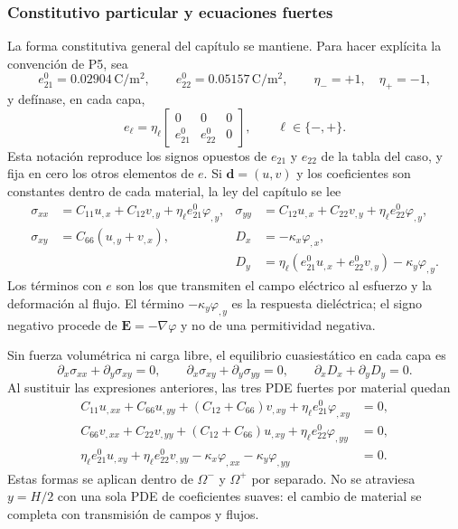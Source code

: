 \subsubsection{Constitutivo particular y ecuaciones fuertes}

La forma constitutiva general del capítulo se mantiene. Para hacer explícita
la convención de P5, sea
\[
  e_{21}^{0}=0.02904\,\mathrm{C}/\mathrm{m}^{2},\qquad
  e_{22}^{0}=0.05157\,\mathrm{C}/\mathrm{m}^{2},\qquad
  \eta_-=+1,\quad \eta_+=-1,
\]
y defínase, en cada capa,
\begin{equation}
  e_\ell=\eta_\ell
  \begin{bmatrix}
    0&0&0\\
    e_{21}^{0}&e_{22}^{0}&0
  \end{bmatrix},
  \qquad \ell\in\{-,+\}.
  \label{eq:p5-expansion-e-sign}
\end{equation}
Esta notación reproduce los signos opuestos de $e_{21}$ y $e_{22}$ de la
tabla del caso, y fija en cero los otros elementos de $e$. Si
$\mathbf d=(u,v)$ y los coeficientes son constantes dentro de cada material,
la ley del capítulo se lee
\begin{align}
  \sigma_{xx}&=C_{11}u_{,x}+C_{12}v_{,y}
       +\eta_\ell e_{21}^{0}\varphi_{,y},
  &\sigma_{yy}&=C_{12}u_{,x}+C_{22}v_{,y}
       +\eta_\ell e_{22}^{0}\varphi_{,y},
  \label{eq:p5-expansion-stress-normal}\\
  \sigma_{xy}&=C_{66}(u_{,y}+v_{,x}),
  &D_x&=-\kappa_x\varphi_{,x},
  \label{eq:p5-expansion-stress-shear}\\
  &&D_y&=\eta_\ell(e_{21}^{0}u_{,x}+e_{22}^{0}v_{,y})
       -\kappa_y\varphi_{,y}.
  \label{eq:p5-expansion-flux}
\end{align}
Los términos con $e$ son los que transmiten el campo eléctrico al esfuerzo y
la deformación al flujo. El término $-\kappa_y\varphi_{,y}$ es la respuesta
dieléctrica; el signo negativo procede de $\mathbf E=-\nabla\varphi$ y no de
una permitividad negativa.

Sin fuerza volumétrica ni carga libre, el equilibrio cuasiestático en cada
capa es
\begin{equation}
  \partial_x\sigma_{xx}+\partial_y\sigma_{xy}=0,\qquad
  \partial_x\sigma_{xy}+\partial_y\sigma_{yy}=0,\qquad
  \partial_xD_x+\partial_yD_y=0.
  \label{eq:p5-expansion-balances}
\end{equation}
Al sustituir las expresiones anteriores, las tres PDE fuertes por material
quedan
\begin{align}
  C_{11}u_{,xx}+C_{66}u_{,yy}+(C_{12}+C_{66})v_{,xy}
      +\eta_\ell e_{21}^{0}\varphi_{,xy}&=0,\\
  C_{66}v_{,xx}+C_{22}v_{,yy}+(C_{12}+C_{66})u_{,xy}
      +\eta_\ell e_{22}^{0}\varphi_{,yy}&=0,\\
  \eta_\ell e_{21}^{0}u_{,xy}+\eta_\ell e_{22}^{0}v_{,yy}
      -\kappa_x\varphi_{,xx}-\kappa_y\varphi_{,yy}&=0.
  \label{eq:p5-expansion-pdes}
\end{align}
Estas formas se aplican dentro de $\Omega^-$ y $\Omega^+$ por separado. No
se atraviesa $y=H/2$ con una sola PDE de coeficientes suaves: el cambio de
material se completa con transmisión de campos y flujos.

